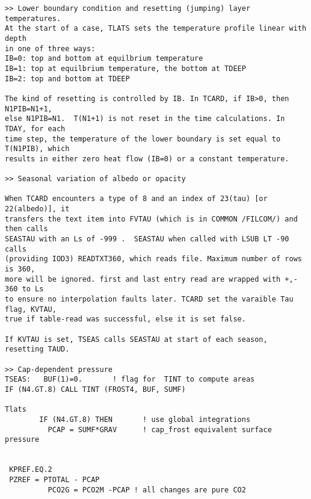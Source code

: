 \begin{verbatim}
>> Lower boundary condition and resetting (jumping) layer temperatures.
At the start of a case, TLATS sets the temperature profile linear with depth
in one of three ways:
IB=0: top and bottom at equilbrium temperature
IB=1: top at equilbrium temperature, the bottom at TDEEP
IB=2: top and bottom at TDEEP

The kind of resetting is controlled by IB. In TCARD, if IB>0, then N1PIB=N1+1,
else N1PIB=N1.  T(N1+1) is not reset in the time calculations. In TDAY, for each
time step, the temperature of the lower boundary is set equal to T(N1PIB), which
results in either zero heat flow (IB=0) or a constant temperature.

>> Seasonal variation of albedo or opacity

When TCARD encounters a type of 8 and an index of 23(tau) [or 22(albedo)], it
transfers the text item into FVTAU (which is in COMMON /FILCOM/) and then calls
SEASTAU with an Ls of -999 .  SEASTAU when called with LSUB LT -90 calls
(providing IOD3) READTXT360, which reads file. Maximum number of rows is 360,
more will be ignored. first and last entry read are wrapped with +,- 360 to Ls
to ensure no interpolation faults later. TCARD set the varaible Tau flag, KVTAU,
true if table-read was successful, else it is set false.

If KVTAU is set, TSEAS calls SEASTAU at start of each season, resetting TAUD.

>> Cap-dependent pressure
TSEAS:   BUF(1)=0.       ! flag for  TINT to compute areas
IF (N4.GT.8) CALL TINT (FROST4, BUF, SUMF)

Tlats
        IF (N4.GT.8) THEN       ! use global integrations
          PCAP = SUMF*GRAV      ! cap_frost equivalent surface pressure


 KPREF.EQ.2
 PZREF = PTOTAL - PCAP
          PCO2G = PCO2M -PCAP ! all changes are pure CO2

\end{verbatim}